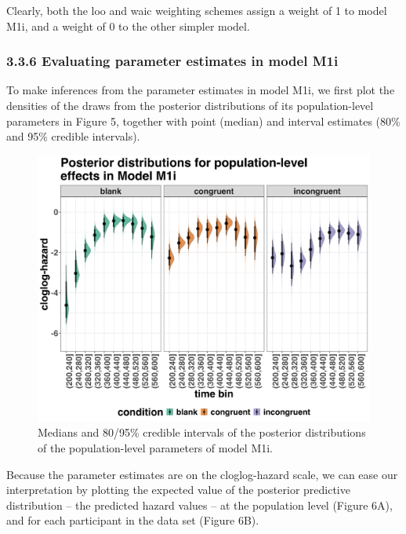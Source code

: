 \documentclass[
  man, donotrepeattitle,floatsintext]{apa6}
\begin{document}
\normalsize

Clearly, both the loo and waic weighting schemes assign a weight of 1 to model M1i, and a weight of 0 to the other simpler model.

\subsubsection{3.3.6 Evaluating parameter estimates in model M1i}\label{evaluating-parameter-estimates-in-model-m1i}

To make inferences from the parameter estimates in model M1i, we first plot the densities of the draws from the posterior distributions of its population-level parameters in Figure 5, together with point (median) and interval estimates (80\% and 95\% credible intervals).



\begin{figure}[H]

{\centering \includegraphics[width=0.8\linewidth,height=0.67\textheight,]{../Tutorial_2_Bayesian/figures/M1i_postdistr} 

}

\caption{Medians and 80/95\% credible intervals of the posterior distributions of the population-level parameters of model M1i.}\label{fig:plot-fixed-effects}
\end{figure}

Because the parameter estimates are on the cloglog-hazard scale, we can ease our interpretation by plotting the expected value of the posterior predictive distribution -- the predicted hazard values -- at the population level (Figure 6A), and for each participant in the data set (Figure 6B).
\end{document}
